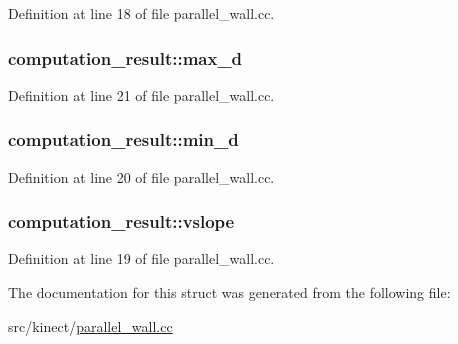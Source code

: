 Definition at line 18 of file parallel\+\_\+wall.\+cc.

\subsubsection[{\texorpdfstring{max\+\_\+d}{max_d}}]{ computation\+\_\+result\+::max\+\_\+d}\hypertarget{structcomputation__result_a41c81296f3d294b08b21123da60d0f7d}{}\label{structcomputation__result_a41c81296f3d294b08b21123da60d0f7d}


Definition at line 21 of file parallel\+\_\+wall.\+cc.

\subsubsection[{\texorpdfstring{min\+\_\+d}{min_d}}]{ computation\+\_\+result\+::min\+\_\+d}\hypertarget{structcomputation__result_aada7e06849adb102b8a848b94c6075b7}{}\label{structcomputation__result_aada7e06849adb102b8a848b94c6075b7}


Definition at line 20 of file parallel\+\_\+wall.\+cc.

\subsubsection[{\texorpdfstring{vslope}{vslope}}]{ computation\+\_\+result\+::vslope}\hypertarget{structcomputation__result_ade1ed4316be9a024f8c5ec120712e591}{}\label{structcomputation__result_ade1ed4316be9a024f8c5ec120712e591}


Definition at line 19 of file parallel\+\_\+wall.\+cc.



The documentation for this struct was generated from the following file\+:\begin{DoxyCompactItemize}
\item 
src/kinect/\hyperlink{parallel__wall_8cc}{parallel\+\_\+wall.\+cc}\end{DoxyCompactItemize}
